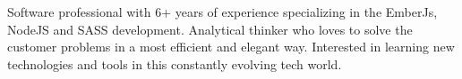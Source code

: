 

\begin{cvparagraph}

Software professional with 6+ years of experience specializing in the EmberJs, NodeJS and SASS development. Analytical thinker who loves to solve the customer problems in a most efficient and elegant way. Interested in learning new technologies and tools in this constantly evolving tech world.

\end{cvparagraph}
